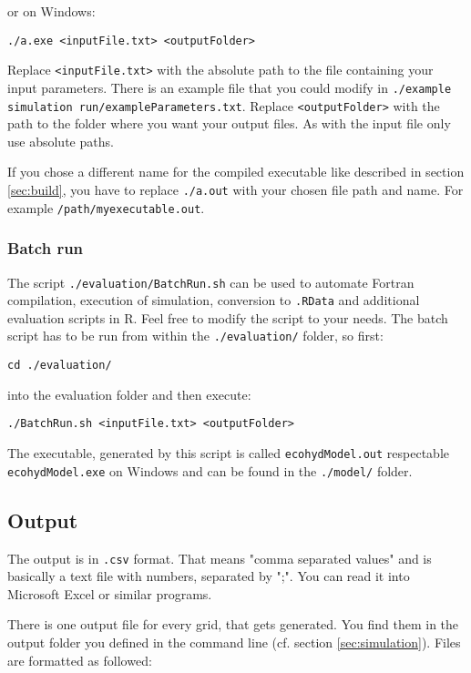 or on Windows:

\texttt{./a.exe <inputFile.txt> <outputFolder>}

Replace \texttt{<inputFile.txt>} with the absolute path to the file containing your input parameters. There is an example file that you could modify in  \texttt{./example simulation run/exampleParameters.txt}. Replace \texttt{<outputFolder>} with the path to the folder where you want your output files. As with the input file only use absolute paths.

If you chose a different name for the compiled executable like described in section \ref{sec:build}, you have to replace \texttt{./a.out} with your chosen file path and name. For example \texttt{/path/myexecutable.out}.




\subsubsection{Batch run \label{sec:batchrun}}

The script \texttt{./evaluation/BatchRun.sh} can be used to automate Fortran compilation, execution of simulation, conversion to \texttt{.RData} and additional evaluation scripts in R. Feel free to modify the script to your needs. The batch script has to be run from within the \texttt{./evaluation/} folder, so first:

\texttt{cd ./evaluation/}

into the evaluation folder and then execute:

\texttt{./BatchRun.sh <inputFile.txt> <outputFolder>}

The executable, generated by this script is called \texttt{ecohydModel.out} respectable \texttt{ecohydModel.exe} on Windows and can be found in the \texttt{./model/} folder.

\subsection{Output \label{sec:output}}

The output is in \texttt{.csv} format. That means "comma separated values" and is basically a text file with numbers, separated by ";". You can read it into Microsoft Excel or similar programs.

There is one output file for every grid, that gets generated. You find them in the output folder you defined in the command line (cf. section \ref{sec:simulation}). Files are formatted as followed:

